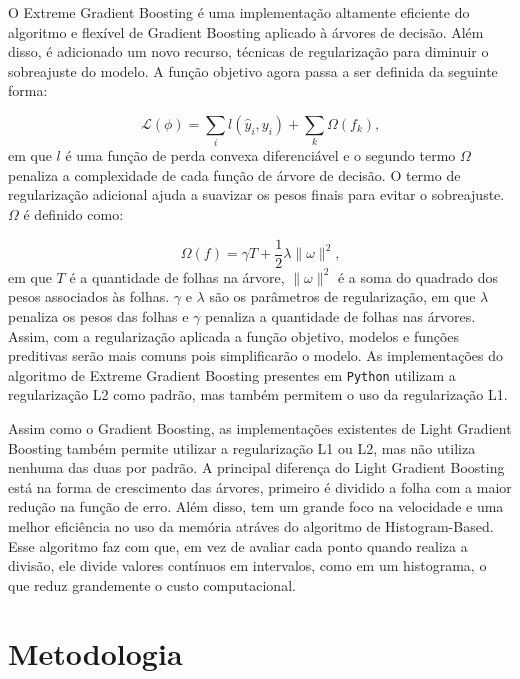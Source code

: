 \documentclass[
  12pt,
  a4paper,
]{scrreprt}
\begin{document}
\vspace{12pt}

O Extreme Gradient Boosting é uma implementação altamente eficiente do
algoritmo e flexível de Gradient Boosting aplicado à árvores de decisão.
Além disso, é adicionado um novo recurso, técnicas de regularização para
diminuir o sobreajuste do modelo. A função objetivo agora passa a ser
definida da seguinte forma:

\[
\mathcal{L}\left(\phi\right) = \sum_{i}l\left(\hat{y}_{i}, y_{i}\right) + \sum_{k}\Omega\left(f_{k}\right)\text{,}
\] em que \(l\) é uma função de perda convexa diferenciável e o segundo
termo \(\Omega\) penaliza a complexidade de cada função de árvore de
decisão. O termo de regularização adicional ajuda a suavizar os pesos
finais para evitar o sobreajuste. \(\Omega\) é definido como:

\[
\Omega\left(f\right) = \gamma T + \frac{1}{2}\lambda\|\omega\|^{2}\text{,}
\] em que \(T\) é a quantidade de folhas na árvore, \(\|\omega\|^{2}\) é
a soma do quadrado dos pesos associados às folhas. \(\gamma\) e
\(\lambda\) são os parâmetros de regularização, em que \(\lambda\)
penaliza os pesos das folhas e \(\gamma\) penaliza a quantidade de
folhas nas árvores. Assim, com a regularização aplicada a função
objetivo, modelos e funções preditivas serão mais comuns pois
simplificarão o modelo. As implementações do algoritmo de Extreme
Gradient Boosting presentes em \texttt{Python} utilizam a regularização
L2 como padrão, mas também permitem o uso da regularização L1.

\vspace{12pt}

Assim como o Gradient Boosting, as implementações existentes de Light
Gradient Boosting também permite utilizar a regularização L1 ou L2, mas
não utiliza nenhuma das duas por padrão. A principal diferença do Light
Gradient Boosting está na forma de crescimento das árvores, primeiro é
dividido a folha com a maior redução na função de erro. Além disso, tem
um grande foco na velocidade e uma melhor eficiência no uso da memória
atráves do algoritmo de Histogram-Based. Esse algoritmo faz com que, em
vez de avaliar cada ponto quando realiza a divisão, ele divide valores
contínuos em intervalos, como em um histograma, o que reduz grandemente
o custo computacional.

\chapter{Metodologia}\label{metodologia}
\end{document}
